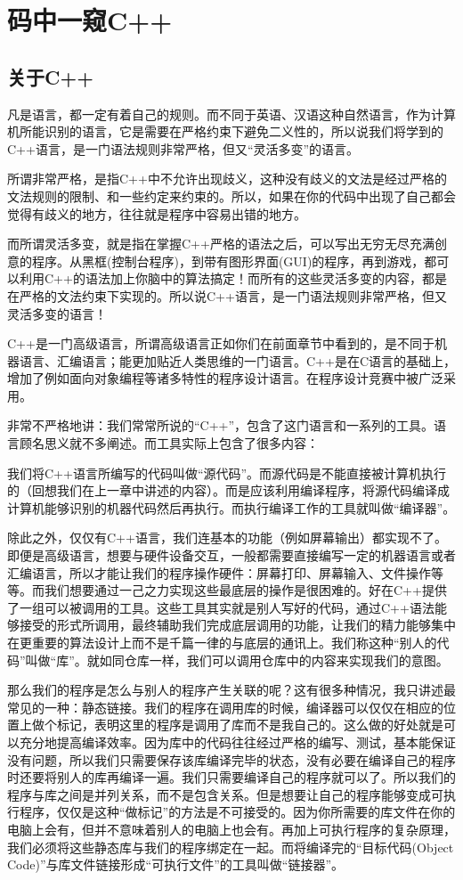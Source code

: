 \chapter{码中一窥C++}

\section{关于C++}

凡是语言，都一定有着自己的规则。而不同于英语、汉语这种自然语言，作为计算机所能识别的语言，它是需要在严格约束下避免二义性的，所以说我们将学到的C++语言，是一门语法规则非常严格，但又“灵活多变”的语言。

所谓非常严格，是指C++中不允许出现歧义，这种没有歧义的文法是经过严格的文法规则的限制、和一些约定来约束的。所以，如果在你的代码中出现了自己都会觉得有歧义的地方，往往就是程序中容易出错的地方。

而所谓灵活多变，就是指在掌握C++严格的语法之后，可以写出无穷无尽充满创意的程序。从黑框(控制台程序)，到带有图形界面(GUI)的程序，再到游戏，都可以利用C++的语法加上你脑中的算法搞定！而所有的这些灵活多变的内容，都是在严格的文法约束下实现的。所以说C++语言，是一门语法规则非常严格，但又灵活多变的语言！

C++是一门高级语言，所谓高级语言正如你们在前面章节中看到的，是不同于机器语言、汇编语言；能更加贴近人类思维的一门语言。C++是在C语言的基础上，增加了例如面向对象编程等诸多特性的程序设计语言。在程序设计竞赛中被广泛采用。

非常不严格地讲：我们常常所说的“C++”，包含了这门语言和一系列的工具。语言顾名思义就不多阐述。而工具实际上包含了很多内容：

我们将C++语言所编写的代码叫做“源代码”。而源代码是不能直接被计算机执行的（回想我们在上一章中讲述的内容）。而是应该利用编译程序，将源代码编译成计算机能够识别的机器代码然后再执行。而执行编译工作的工具就叫做“编译器”。

除此之外，仅仅有C++语言，我们连基本的功能（例如屏幕输出）都实现不了。即便是高级语言，想要与硬件设备交互，一般都需要直接编写一定的机器语言或者汇编语言，所以才能让我们的程序操作硬件：屏幕打印、屏幕输入、文件操作等等。而我们想要通过一己之力实现这些最底层的操作是很困难的。好在C++提供了一组可以被调用的工具。这些工具其实就是别人写好的代码，通过C++语法能够接受的形式所调用，最终辅助我们完成底层调用的功能，让我们的精力能够集中在更重要的算法设计上而不是千篇一律的与底层的通讯上。我们称这种“别人的代码”叫做“库”。就如同仓库一样，我们可以调用仓库中的内容来实现我们的意图。

那么我们的程序是怎么与别人的程序产生关联的呢？这有很多种情况，我只讲述最常见的一种：静态链接。我们的程序在调用库的时候，编译器可以仅仅在相应的位置上做个标记，表明这里的程序是调用了库而不是我自己的。这么做的好处就是可以充分地提高编译效率。因为库中的代码往往经过严格的编写、测试，基本能保证没有问题，所以我们只需要保存该库编译完毕的状态，没有必要在编译自己的程序时还要将别人的库再编译一遍。我们只需要编译自己的程序就可以了。所以我们的程序与库之间是并列关系，而不是包含关系。但是想要让自己的程序能够变成可执行程序，仅仅是这种“做标记”的方法是不可接受的。因为你所需要的库文件在你的电脑上会有，但并不意味着别人的电脑上也会有。再加上可执行程序的复杂原理，我们必须将这些静态库与我们的程序绑定在一起。而将编译完的“目标代码(Object Code)”与库文件链接形成“可执行文件”的工具叫做“链接器”。

